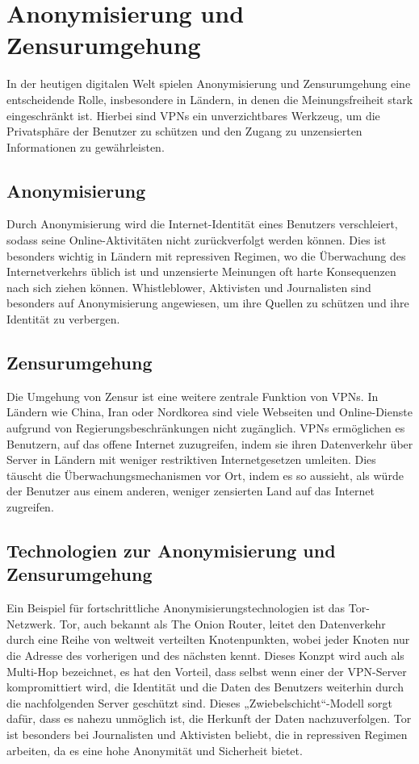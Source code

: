 \section{Anonymisierung und Zensurumgehung} \label{ano-zensur}
In der heutigen digitalen Welt spielen Anonymisierung und Zensurumgehung eine entscheidende Rolle, insbesondere in Ländern, in denen die Meinungsfreiheit stark eingeschränkt ist. Hierbei sind \gls{VPN}s ein unverzichtbares Werkzeug, um die Privatsphäre der Benutzer zu schützen und den Zugang zu unzensierten Informationen zu gewährleisten. 

\subsection{Anonymisierung}
Durch Anonymisierung wird die Internet-Identität eines Benutzers verschleiert, sodass seine Online-Aktivitäten nicht zurückverfolgt werden können. Dies ist besonders wichtig in Ländern mit repressiven Regimen, wo die Überwachung des Internetverkehrs üblich ist und unzensierte Meinungen oft harte Konsequenzen nach sich ziehen können. Whistleblower, Aktivisten und Journalisten sind besonders auf Anonymisierung angewiesen, um ihre Quellen zu schützen und ihre Identität zu verbergen. \cite{anonym}

\subsection{Zensurumgehung}
Die Umgehung von Zensur ist eine weitere zentrale Funktion von \gls{VPN}s. In Ländern wie China, Iran oder Nordkorea sind viele Webseiten und Online-Dienste aufgrund von Regierungsbeschränkungen nicht zugänglich. \gls{VPN}s ermöglichen es Benutzern, auf das offene Internet zuzugreifen, indem sie ihren Datenverkehr über Server in Ländern mit weniger restriktiven Internetgesetzen umleiten. Dies täuscht die Überwachungsmechanismen vor Ort, indem es so aussieht, als würde der Benutzer aus einem anderen, weniger zensierten Land auf das Internet zugreifen. \cite{6128478}

\subsection{Technologien zur Anonymisierung und Zensurumgehung}
Ein Beispiel für fortschrittliche Anonymisierungstechnologien ist das Tor-Netzwerk. Tor, auch bekannt als The Onion Router, leitet den Datenverkehr durch eine Reihe von weltweit verteilten Knotenpunkten, wobei jeder Knoten nur die Adresse des vorherigen und des nächsten kennt. Dieses Konzpt wird auch als Multi-Hop bezeichnet, es hat den Vorteil, dass selbst wenn einer der \gls{VPN}-Server kompromittiert wird, die Identität und die Daten des Benutzers weiterhin durch die nachfolgenden Server geschützt sind. Dieses „Zwiebelschicht“-Modell sorgt dafür, dass es nahezu unmöglich ist, die Herkunft der Daten nachzuverfolgen. Tor ist besonders bei Journalisten und Aktivisten beliebt, die in repressiven Regimen arbeiten, da es eine hohe Anonymität und Sicherheit bietet. \cite{Tor}

